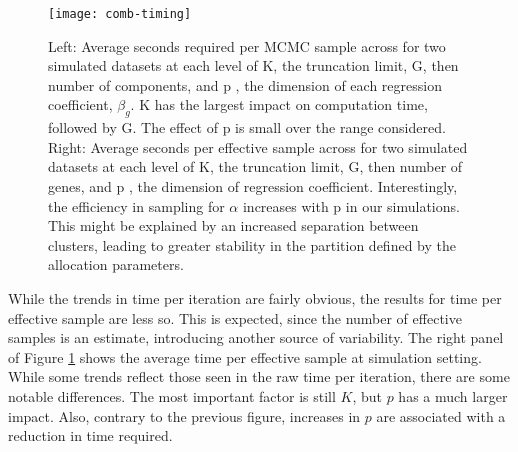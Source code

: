 {%

\begin{figure}[!h]
\centering
\texttt{[image: comb-timing]}
\caption[Average number of seconds per MCMC sample]{\small Left: Average seconds required per MCMC sample across for two simulated datasets at each level of K, the truncation limit, G, then number of components, and p , the dimension of each regression coefficient, $\beta_g$. K has the largest impact on computation time, followed by G. The effect of p is small over the range considered. Right: Average seconds per effective sample across for two simulated datasets at each level of K, the truncation limit, G, then number of genes, and p , the dimension of regression coefficient. Interestingly, the efficiency in sampling for $\alpha$ increases with p in our simulations. This might be explained by an increased separation between clusters, leading to greater stability in the partition defined by the allocation parameters.}%
\label{timing}
\end{figure}

While the trends in time per iteration are fairly obvious, the results for time per effective sample are less so. This is expected, since the number of effective samples is an estimate, introducing another source of variability. The right panel of Figure \ref{timing} shows the average time per effective sample at simulation setting. While some trends reflect those seen in the raw time per iteration, there are some notable differences. The most important factor is still $K$, but $p$ has a much larger impact. Also, contrary to the previous figure, increases in $p$ are associated with a reduction in time required.

}
